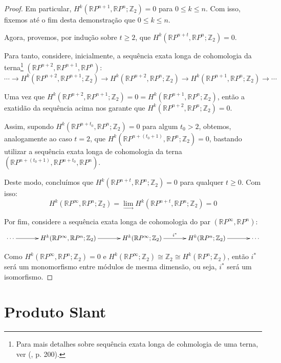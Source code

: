 \documentclass[12pt,oneside]{book} %
\newcommand{\RP}{\mathbb{R}P}
\newcommand{\Z}{\mathbb{Z}}
\begin{document}
\begin{proof}
	\par Em particular, $H^{k}(\RP^{n+1},\RP^{n};\Z_{2})=0$ para $0\leq k\leq n$. Com isso, fixemos até o fim desta demonstração que $0\leq k\leq n$.
	
	\par Agora, provemos, por indução sobre $t\geq 2$, que $H^{k}(\RP^{n+t},\RP^{n};\Z_{2})=0$.
	
	\par Para tanto, considere, inicialmente, a sequência exata longa de cohomologia da terna\footnote{Para mais detalhes sobre sequência exata longa de cohmologia de uma terna, ver (\cite{hatcher}, p. 200).} $(\RP^{n+2},\RP^{n+1},\RP^{n})$:
	$$ \cdots \to H^{k}(\RP^{n+2},\RP^{n+1};\Z_{2}) \to H^{k}(\RP^{n+2},\RP^{n};\Z_{2})\to H^{k}(\RP^{n+1},\RP^{n};\Z_{2})\to  \cdots  $$
	
	\par Uma vez que $H^{k}(\RP^{n+2},\RP^{n+1};\Z_{2})=0=H^{k}(\RP^{n+1},\RP^{n};\Z_{2})$, então a exatidão da sequência acima nos garante que $H^{k}(\RP^{n+2},\RP^{n};\Z_{2})=0$.
	
	\par Assim, supondo $H^{k}(\RP^{n+t_{0}},\RP^{n};\Z_{2})=0$ para algum $t_{0}> 2$, obtemos, analogamente ao caso $t=2$, que $H^{k}(\RP^{n+(t_{0}+1)},\RP^{n};\Z_{2})=0$, bastando utilizar a sequência exata longa de cohomologia da terna $(\RP^{n+(t_{0}+1)},\RP^{n+t_{0}},\RP^{n})$.
	
	\par Deste modo, concluímos que $H^{k}(\RP^{n+t},\RP^{n};\Z_{2})=0$ para qualquer $t\geq 0$. Com isso:
	$$ H^{k}(\RP^{\infty},\RP^{n};\Z_{2})=\lim_{\longrightarrow}H^{k}(\RP^{n+t},\RP^{n};\Z_{2})=0 $$
	
	\par Por fim, considere a sequência exata longa de cohomologia do par $(\RP^{\infty},\RP^{n})$:	
	$$ \xymatrix @C=0.5cm {
		\cdots \ar[rr] && H^{k}(\RP^{\infty},\RP^{n};\Z_{2}) \ar[rr] && H^{k}(\RP^{\infty};\Z_{2}) \ar[rr]^-{i^{*}} && H^{k}(\RP^{n};\Z_{2}) \ar[rr] && \cdots
	} $$
	
	\par Como $H^{k}(\RP^{\infty},\RP^{n};\Z_{2})=0$ e $H^{k}(\RP^{\infty};\Z_{2})\cong\Z_{2}\cong H^{k}(\RP^{n};\Z_{2})$, então $i^{*}$ será um monomorfismo entre módulos de mesma dimensão, ou seja, $i^{*}$ será um isomorfismo.
	
\end{proof}



\section{Produto Slant}\label{ap_slant}
\end{document}
